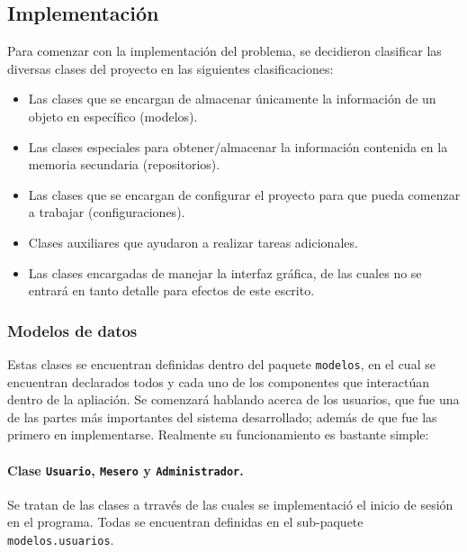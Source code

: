\subsection*{Implementación}


Para comenzar con la implementación del problema, se decidieron clasificar las
diversas clases del proyecto en las siguientes clasificaciones:

\begin{itemize}
  \item Las clases que se encargan de almacenar únicamente la información de 
  un objeto en específico (modelos).
  \item Las clases especiales para obtener/almacenar la información contenida 
  en la memoria secundaria (repositorios).
  \item Las clases que se encargan de configurar el proyecto para que pueda 
  comenzar a trabajar (configuraciones).
  \item Clases auxiliares que ayudaron a realizar tareas adicionales.
  \item Las clases encargadas de manejar la interfaz gráfica, de las cuales no 
  se entrará en tanto detalle para efectos de este escrito.
\end{itemize}

\subsubsection*{Modelos de datos}

Estas clases se encuentran definidas dentro del paquete \texttt{modelos}, en 
el cual se encuentran declarados todos y cada uno de los componentes que 
interactúan dentro de la apliación. Se comenzará hablando acerca de los 
usuarios, que fue una de las partes más importantes del sistema desarrollado; 
además de que fue las primero en implementarse. Realmente su funcionamiento
es bastante simple:

\paragraph{Clase \texttt{Usuario}, \texttt{Mesero} y \texttt{Administrador}.} 
Se tratan de las clases a trravés de las cuales se implementació el inicio de 
sesión en el programa. Todas se encuentran definidas en el sub-paquete 
\texttt{modelos.usuarios}.

